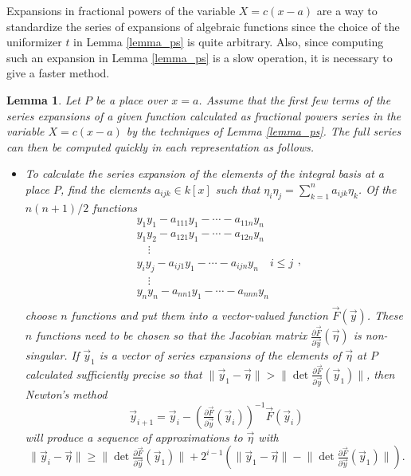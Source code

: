\documentclass[12pt,reqno]{amsart}
\numberwithin{equation}{section}
\newtheorem{lemma}[theorem]{Lemma}
\begin{document}
Expansions in fractional powers of the variable $X=c(x-a)$ are a way to standardize the series of expansions of algebraic functions since the choice of the uniformizer $t$ in Lemma \ref{lemma_ps} is quite arbitrary. Also, since computing such an expansion in Lemma \ref{lemma_ps} is a slow operation, it is necessary to give a faster method.

\begin{lemma}
Let $P$ be a place over $x=a$. Assume that the first few terms of the series expansions of a given function calculated as fractional powers series in the variable $X=c(x-a)$ by the techniques of Lemma \ref{lemma_ps}. The full series can then be computed quickly in each representation as follows.
\begin{itemize}
\item[(M)]To calculate the series expansion of the elements of the integral basis at a place $P$, find the elements $a_{ijk} \in k[x]$ such that $\eta_i \eta_j= \sum_{k=1}^{n}a_{ijk}\eta_k$. Of the $n(n+1)/2$ functions
\begin{equation*}
\begin{array}{l}
y_1 y_1 - a_{111}y_1 - \cdots- a_{11n} y_n\\
y_1 y_2 - a_{121}y_1 - \cdots- a_{12n} y_n\\
\quad \vdots\\
y_i y_j - a_{ij1}y_1 - \cdots- a_{ijn} y_n \quad i\le j\\
\quad \vdots\\
y_n y_n - a_{nn1}y_1 - \cdots- a_{nnn} y_n\\
\end{array}\text{,}
\end{equation*}
choose $n$ functions and put them into a vector-valued function $\vec{F}(\vec{y})$. These $n$ functions need to be chosen so that the Jacobian matrix $\frac{\partial \vec{F}}{\partial \vec{y}}(\vec{\eta})$ is non-singular. If $\vec{y}_1$ is a vector of series expansions of the elements of $\vec{\eta}$ at $P$ calculated sufficiently precise so that $\lVert \vec{y}_1-\vec{\eta} \rVert > \lVert \det \tfrac{\partial \vec{F}}{\partial \vec{y}}(\vec{y}_1) \rVert $, then Newton's method
\begin{equation*}
 \vec{y}_{i+1} = \vec{y}_{i} - (\tfrac{\partial \vec{F}}{\partial \vec{y}}(\vec{y}_i))^{-1} \vec{F}(\vec{y}_i)
\end{equation*}
will produce a sequence of approximations to $\vec{\eta}$ with
\begin{equation*}
 \lVert \vec{y}_i-\vec{\eta} \rVert \ge \lVert \det \tfrac{\partial \vec{F}}{\partial \vec{y}}(\vec{y}_1) \rVert + 2^{i-1}(\lVert \vec{y}_1-\vec{\eta} \rVert - \lVert \det \tfrac{\partial \vec{F}}{\partial \vec{y}}(\vec{y}_1) \rVert)\text{.}
\end{equation*}



\end{itemize}
\end{lemma}
\end{document}
